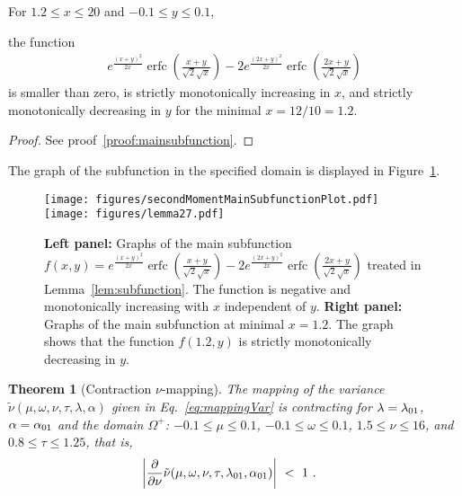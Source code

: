 \documentclass{article}
\newtheorem{theorem}{Theorem}
\newcommand\nunn{{\tilde \nu}}
\renewcommand{\leq}{\leqslant}
\DeclareMathOperator{\erfc}{erfc}
\begin{document}
\begin{lemma}
\label{lem:subfunction}

For $1.2 \leq x \leq 20$ and $-0.1 \leq y \leq 0.1$, 

the function
\begin{align}
\label{eq:subfunction}
e^{\frac{(x+y)^2}{2 x}} \erfc \left(\frac{x+y}{\sqrt{2} \sqrt{x}}\right)-2 e^{\frac{(2 x+y)^2}{2 x}} \erfc \left(\frac{2 x+y}{\sqrt{2} \sqrt{x}}\right)
\end{align}
is smaller than zero, is strictly monotonically increasing in $x$,
and strictly monotonically decreasing in $y$ for the minimal $x=12/10=1.2$.
\end{lemma}

\begin{proof}
See proof~\ref{proof:mainsubfunction}.
\end{proof}

The graph of the subfunction in the specified domain is displayed in Figure~\ref{fig:subfunction}.

\begin{figure}
 \centering
 \texttt{[image: figures/secondMomentMainSubfunctionPlot.pdf]}
 \texttt{[image: figures/lemma27.pdf]}
 \caption[Graph of the main subfunction of the derivative of the second moment]{{\bf Left panel:} Graphs of the main subfunction $f(x,y)=e^{\frac{(x+y)^2}{2 x}} \erfc \left(\frac{x+y}{\sqrt{2} \sqrt{x}}\right)-2 e^{\frac{(2 x+y)^2}{2 x}} \erfc \left(\frac{2 x+y}{\sqrt{2} \sqrt{x}}\right)$
  treated in Lemma~\ref{lem:subfunction}. The function is negative and monotonically increasing with $x$ independent of $y$. 
   {\bf Right panel:}  Graphs of the main subfunction at minimal $x=1.2$. The graph shows that the function $f(1.2,y)$ is strictly monotonically decreasing in $y$.
  \label{fig:subfunction}}
\end{figure}







\begin{theorem}[Contraction $\nu$-mapping]
\label{th:s2Cont}
The mapping of the variance $\nunn(\mu, \omega, \nu, \tau,\lambda,\alpha )$  given in Eq.~\eqref{eq:mappingVar}
is contracting for 
$\lambda=\lambda_{\rm 01}$, $\alpha=\alpha_{\rm 01}$
and the domain $\Omega^+$: 
$-0.1 \leq \mu \leq 0.1$, 
$-0.1 \leq \omega \leq 0.1$,
$1.5 \leq \nu \leq 16$, and 
$0.8 \leq \tau \leq 1.25$, that is,
\begin{align}
&\left| \frac{\partial}{\partial \nu}\nunn(\mu,\omega,\nu,\tau,\lambda_{\rm 01},\alpha_{\rm 01}) \right| \ < \ 1 \ .
\end{align}
\end{theorem}
\end{document}
